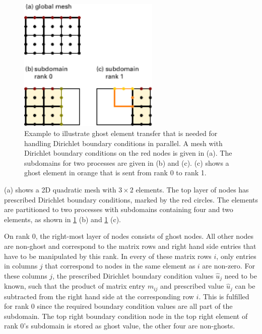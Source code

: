 \begin{figure}%
  \centering%
  \includegraphics[width=0.6\textwidth]{images/implementation/dirichlet_bc_example.pdf}%
  \caption{Example to illustrate ghost element transfer that is needed for handling Dirichlet boundary conditions in parallel. A mesh with Dirichlet boundary conditions on the red nodes is given in (a). The subdomains for two processes are given in (b) and (c). (c) shows a ghost element in orange that is sent from rank 0 to rank 1.}%
  \label{fig:dirichlet_bc_example}%
\end{figure}%

 (a) shows a 2D quadratic mesh with $3 \times 2$ elements. The top layer of nodes has prescribed Dirichlet boundary conditions, marked by the red circles. The elements are partitioned to two processes with subdomains containing four and two elements, as shown in \cref{fig:dirichlet_bc_example} (b) and \cref{fig:dirichlet_bc_example} (c). 

On rank 0, the right-most layer of nodes consists of ghost nodes. All other nodes are non-ghost and correspond to the matrix rows and right hand side entries that have to be manipulated by this rank.
In every of these matrix rows $i$, only entries in columns $j$ that correspond to nodes in the same element as $i$ are non-zero. For these columns $j$, the prescribed Dirichlet boundary condition values $\hat{u}_j$ need to be known, such that the product of matrix entry $m_{ij}$ and prescribed value $\hat{u}_j$ can be subtracted from the right hand side at the corresponding row $i$. This is fulfilled for rank 0 since the required boundary condition values are all part of the subdomain. The top right boundary condition node in the top right element of rank 0's subdomain is stored as ghost value, the other four are non-ghosts.

